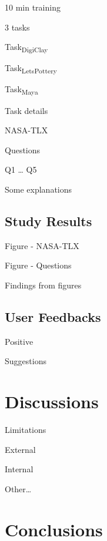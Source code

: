 10 min training

3 tasks

Task\textsubscript{DigiClay}

Task\textsubscript{LetsPottery}

Task\textsubscript{Maya}

Task details

NASA-TLX

Questions

Q1
…
Q5

Some explanations




\subsection{Study Results}
\label{sec:2}

Figure - NASA-TLX

Figure - Questions

Findings from figures


\subsection{User Feedbacks}
\label{sec:2}

Positive

Suggestions



\section{Discussions}
\label{sec:1}

Limitations

External 

Internal

Other…




\section{Conclusions}
\label{sec:1}





